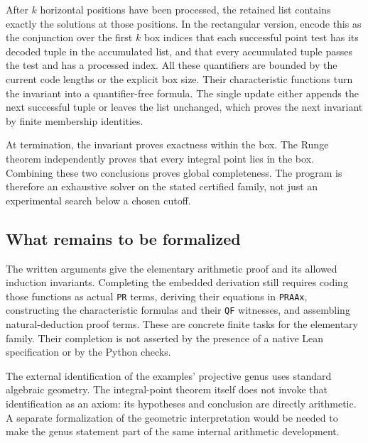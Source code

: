 After $k$ horizontal positions have been processed, the retained list
contains exactly the solutions at those positions. In the rectangular
version, encode this as the conjunction over the first $k$ box indices
that each successful point test has its decoded tuple in the accumulated
list, and that every accumulated tuple passes the test and has a
processed index. All these quantifiers are bounded by the current code
lengths or the explicit box size. Their characteristic functions turn
the invariant into a quantifier-free formula. The single update either
appends the next successful tuple or leaves the list unchanged, which
proves the next invariant by finite membership identities.

At termination, the invariant proves exactness within the box. The
Runge theorem independently proves that every integral point lies in
the box. Combining these two conclusions proves global completeness.
The program is therefore an exhaustive solver on the stated certified
family, not just an experimental search below a chosen cutoff.

\subsection{What remains to be formalized}

The written arguments give the elementary arithmetic proof and its
allowed induction invariants. Completing the embedded derivation still
requires coding those functions as actual \texttt{PR} terms, deriving
their equations in \texttt{PRAAx}, constructing the characteristic
formulas and their \texttt{QF} witnesses, and assembling natural-deduction
proof terms. These are concrete finite tasks for the elementary family.
Their completion is not asserted by the presence of a native Lean
specification or by the Python checks.

The external identification of the examples' projective genus uses
standard algebraic geometry. The integral-point theorem itself does
not invoke that identification as an axiom: its hypotheses and
conclusion are directly arithmetic. A separate formalization of the
geometric interpretation would be needed to make the genus statement
part of the same internal arithmetic development.
